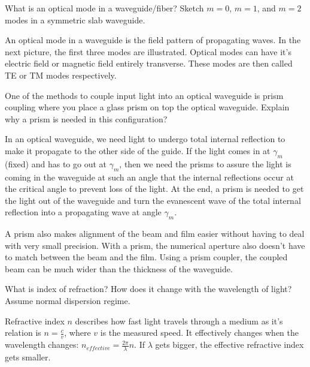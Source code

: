 \documentclass[answers, addpoints]{exam} %
\begin{document}
\begin{questions}

	\question[5] What is an optical mode in a waveguide/fiber? Sketch $m=0$, $m=1$, and $m=2$ modes in a symmetric slab waveguide.
	\begin{solution}
		An optical mode in a waveguide is the field pattern of propagating waves.
		In the next picture, the first three modes are illustrated.
		Optical modes can have it's electric field or magnetic field entirely transverse.
		These modes are then called TE or TM modes respectively.
	\end{solution}

	\question[5] One of the methods to couple input light into an optical waveguide is prism coupling where you place a glass prism on top the optical waveguide. Explain why a prism is needed in this configuration?
	\begin{solution}
		In an optical waveguide, we need light to undergo total internal reflection to make it propagate to the other side of the guide.
		If the light comes in at $\gamma_m$ (fixed) and has to go out at $\gamma_m$, then we need the prisms to assure the light is coming in the waveguide at such an angle that the internal reflections occur at the critical angle to prevent loss of the light.
		At the end, a prism is needed to get the light out of the waveguide and turn the evanescent wave of the total internal reflection into a propagating wave at angle $\gamma_m$.
		
		A prism also makes alignment of the beam and film easier without having to deal with very small precision.
		With a prism, the numerical aperture also doesn't have to match between the beam and the film.
		Using a prism coupler, the coupled beam can be much wider than the thickness of the waveguide.
	\end{solution}

	\question[5] What is index of refraction? How does it change with the wavelength of light? Assume normal dispersion regime.
	\begin{solution}
		Refractive index $n$ describes how fast light travels through a medium as it's relation is $n = \frac{c}{v}$, where $v$ is the measured speed.
		It effectively changes when the wavelength changes:
		$n_{effective} = \frac{2\pi}{\lambda} n$.
		If $\lambda$ gets bigger, the effective refractive index gets smaller.
	\end{solution}
	

\end{questions}
\end{document}
